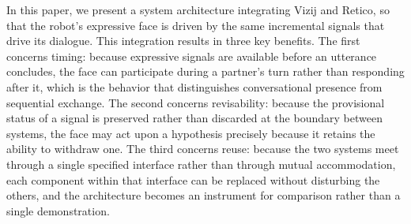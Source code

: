 \documentclass[conference]{IEEEtran}
\begin{document}
In this paper, we present a system architecture integrating Vizij and Retico, so that the robot's expressive face is driven by the same incremental signals that drive its dialogue. This integration results in three key benefits. The first concerns timing: because expressive signals are
available before an utterance concludes, the face can participate during a
partner's turn rather than responding after it, which is the behavior that
distinguishes conversational presence from sequential exchange. The second
concerns revisability: because the provisional status of a signal is preserved
rather than discarded at the boundary between systems, the face may act upon a
hypothesis precisely because it retains the ability to withdraw one. The third
concerns reuse: because the two systems meet through a single specified
interface rather than through mutual accommodation, each component within that
interface can be replaced without disturbing the others, and the architecture
becomes an instrument for comparison rather than a single demonstration.
\end{document}
